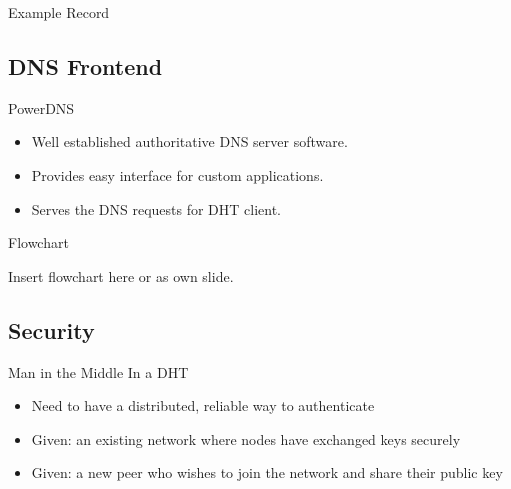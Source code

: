 \documentclass[11pt]{beamer}
\begin{document}
\begin{frame}{Example Record}
	
\end{frame}



\subsection{DNS Frontend}
\begin{frame}{PowerDNS}
\begin{itemize}
	\item Well established authoritative DNS server software.	
	\item Provides easy interface for custom applications.
	\item Serves the DNS requests for DHT client.
\end{itemize}

\end{frame}

\begin{frame}{Flowchart}
	
	Insert flowchart here or as own slide.
	
\end{frame}



\subsection{Security}

\begin{frame}{Man in the Middle In a DHT}
	
	\begin{itemize}
		\item Need to have a distributed, reliable way to authenticate 
		\item  Given: an existing network where nodes have exchanged keys securely
		\item  Given: a new peer who wishes to join the network and share their public key
		
	\end{itemize}
	
	
\end{frame}
\end{document}
